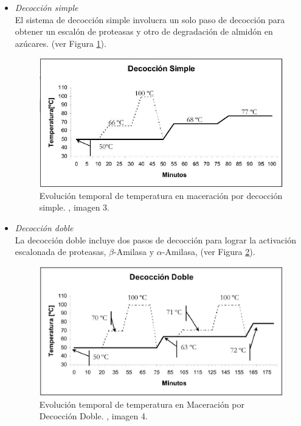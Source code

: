                 \begin{itemize}
                    \item \textit{Decocción simple} \\ El sistema de decocción simple involucra un solo paso de decocción para obtener un escalón de proteasas y otro de degradación de almidón en azúcares. (ver Figura \ref{MaceracionDecoccionSimple}).\hfill \break 
                    \hfill \break 
                    \begin{figure} [ht]                  \centerline{\includegraphics[scale=0.7]{decoccion_simple.jpg}}
                        \caption{Evolución temporal de temperatura en maceración por decocción simple. \cite{Ceresvis}, imagen 3.}
                        \label{MaceracionDecoccionSimple}
                    \end{figure}
                    
                    \item \textit{Decocción doble} \\ La decocción doble incluye dos pasos de decocción para lograr la activación escalonada de proteasas, $\beta$-Amilasa y $\alpha$-Amilasa, (ver Figura \ref{MaceracionDecoccionDoble}).
                    
                    \begin{figure} [ht]		                                                            \centerline{\includegraphics[scale=0.5]{decoccion_doble.jpg}}
                        \caption{Evolución temporal de temperatura en Maceración por Decocción Doble. \cite{Ceresvis}, imagen 4.}
                        \label{MaceracionDecoccionDoble}
                    \end{figure}
                    

\end{itemize}
